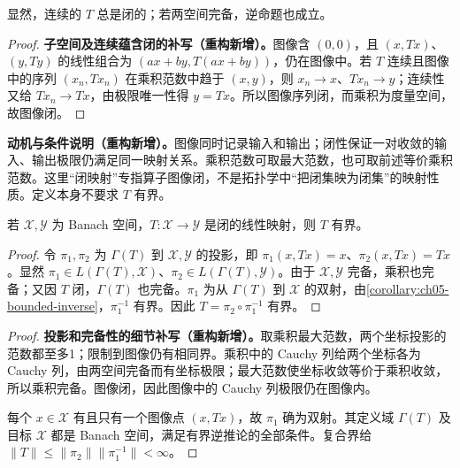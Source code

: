 \documentclass[../../main.tex]{subfiles}
\begin{document}
显然，连续的 $T$ 总是闭的；若两空间完备，逆命题也成立。
\begin{proof}
\textbf{子空间及连续蕴含闭的补写（重构新增）。}图像含 $(0,0)$，且 $(x,Tx)$、$(y,Ty)$ 的线性组合为 $(ax+by,T(ax+by))$，仍在图像中。若 $T$ 连续且图像中的序列 $(x_n,Tx_n)$ 在乘积范数中趋于 $(x,y)$，则 $x_n\to x$、$Tx_n\to y$；连续性又给 $Tx_n\to Tx$，由极限唯一性得 $y=Tx$。所以图像序列闭，而乘积为度量空间，故图像闭。
\end{proof}
\begin{remark}
\textbf{动机与条件说明（重构新增）。}图像同时记录输入和输出；闭性保证一对收敛的输入、输出极限仍满足同一映射关系。乘积范数可取最大范数，也可取前述等价乘积范数。这里“闭映射”专指算子图像闭，不是拓扑学中“把闭集映为闭集”的映射性质。定义本身不要求 $T$ 有界。
\end{remark}
\begin{theorem}[闭图像定理]\label{theorem:ch05-closed-graph}
若 $\mathcal X,\mathcal Y$ 为 Banach 空间，$T:\mathcal X\to\mathcal Y$ 是闭的线性映射，则 $T$ 有界。
\end{theorem}
\begin{proof}
令 $\pi_1,\pi_2$ 为 $\Gamma(T)$ 到 $\mathcal X,\mathcal Y$ 的投影，即 $\pi_1(x,Tx)=x$、$\pi_2(x,Tx)=Tx$。显然 $\pi_1\in L(\Gamma(T),\mathcal X)$、$\pi_2\in L(\Gamma(T),\mathcal Y)$。由于 $\mathcal X,\mathcal Y$ 完备，乘积也完备；又因 $T$ 闭，$\Gamma(T)$ 也完备。$\pi_1$ 为从 $\Gamma(T)$ 到 $\mathcal X$ 的双射，由\cref{corollary:ch05-bounded-inverse}，$\pi_1^{-1}$ 有界。因此 $T=\pi_2\circ\pi_1^{-1}$ 有界。
\end{proof}
\begin{proof}
\textbf{投影和完备性的细节补写（重构新增）。}取乘积最大范数，两个坐标投影的范数都至多1；限制到图像仍有相同界。乘积中的 Cauchy 列给两个坐标各为 Cauchy 列，由两空间完备而有坐标极限；最大范数使坐标收敛等价于乘积收敛，所以乘积完备。图像闭，因此图像中的 Cauchy 列极限仍在图像内。

每个 $x\in\mathcal X$ 有且只有一个图像点 $(x,Tx)$，故 $\pi_1$ 确为双射。其定义域 $\Gamma(T)$ 及目标 $\mathcal X$ 都是 Banach 空间，满足有界逆推论的全部条件。复合界给 $\|T\|\le\|\pi_2\|\|\pi_1^{-1}\|<\infty$。
\end{proof}
\end{document}
